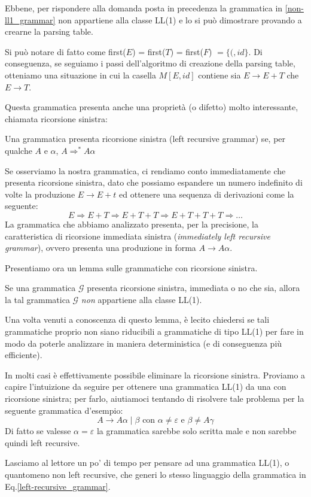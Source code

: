 \documentclass[class=book, crop=false, oneside, 12pt]{standalone}
\begin{document}
Ebbene, per rispondere alla domanda posta in precedenza la grammatica in \ref{non-ll1_grammar} non appartiene alla classe LL(1) e lo si può dimostrare provando a crearne la parsing table.

Si può notare di fatto come first(\(E\)) = first(\(T\)) = first(\(F\)) \(= \{(, id\}\).
Di conseguenza, se seguiamo i passi dell'algoritmo di creazione della parsing table, otteniamo una situazione in cui la casella \(M[E, id]\) contiene sia \(E \to E+T\) che \(E \to T\).

Questa grammatica presenta anche una proprietà (o difetto) molto interessante, chiamata ricorsione sinistra:
\begin{definition}
    Una grammatica presenta ricorsione sinistra (left recursive grammar) se, per qualche \(A\) e \(\alpha\), \(A \Rightarrow^* A\alpha\)
\end{definition}

Se osserviamo la nostra grammatica, ci rendiamo conto immediatamente che presenta ricorsione sinistra, dato che possiamo espandere un numero indefinito di volte la produzione \(E \to E+t\) ed ottenere una sequenza di derivazioni come la seguente:
\begin{equation*}
    E \Rightarrow E+T \Rightarrow E+T+T \Rightarrow E+T+T+T \Rightarrow \dots
\end{equation*}
La grammatica che abbiamo analizzato presenta, per la precisione, la caratteristica di ricorsione immediata sinistra (\emph{immediately left recursive grammar}), ovvero presenta una produzione in forma \(A \to A\alpha\).

Presentiamo ora un lemma sulle grammatiche con ricorsione sinistra.
\begin{lemma}
    Se una grammatica \(\mathcal{G}\) presenta ricorsione sinistra, immediata o no che sia, allora la tal grammatica \(\mathcal{G}\) \emph{non} appartiene alla classe LL(1).
\end{lemma}
Una volta venuti a conoscenza di questo lemma, è lecito chiedersi se tali grammatiche proprio non siano riducibili a grammatiche di tipo LL(1) per fare in modo da poterle analizzare in maniera deterministica (e di conseguenza più efficiente).

In molti casi è effettivamente possibile eliminare la ricorsione sinistra. 
Proviamo a capire l'intuizione da seguire per ottenere una grammatica LL(1) da una con ricorsione sinistra; per farlo, aiutiamoci tentando di risolvere tale problema per la seguente grammatica d'esempio:
\begin{equation*}
    \label{left-recursive_grammar}
    A \to A \alpha \mid \beta \textrm{  con  } \alpha \neq \varepsilon \textrm{  e  } \beta \neq A \gamma
\end{equation*}
Di fatto se valesse \(\alpha = \varepsilon\) la grammatica sarebbe solo scritta male e non sarebbe quindi left recursive.

Lasciamo al lettore un po' di tempo per pensare ad una grammatica LL(1), o quantomeno non left recursive, che generi lo stesso linguaggio della grammatica in Eq.\ref{left-recursive_grammar}.
\end{document}
